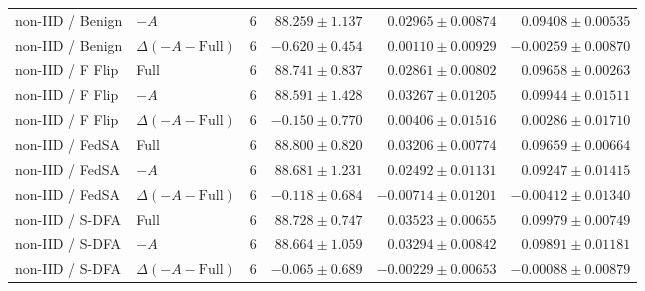 \begin{table}[t]
\begin{tabular}{llrrrr}
non-IID / Benign & $-A$ & 6 & $88.259 \pm 1.137$ & $0.02965 \pm 0.00874$ & $0.09408 \pm 0.00535$ \\
non-IID / Benign & $\Delta(-A-\mathrm{Full})$ & 6 & $-0.620 \pm 0.454$ & $0.00110 \pm 0.00929$ & $-0.00259 \pm 0.00870$ \\
non-IID / F Flip & Full & 6 & $88.741 \pm 0.837$ & $0.02861 \pm 0.00802$ & $0.09658 \pm 0.00263$ \\
non-IID / F Flip & $-A$ & 6 & $88.591 \pm 1.428$ & $0.03267 \pm 0.01205$ & $0.09944 \pm 0.01511$ \\
non-IID / F Flip & $\Delta(-A-\mathrm{Full})$ & 6 & $-0.150 \pm 0.770$ & $0.00406 \pm 0.01516$ & $0.00286 \pm 0.01710$ \\
non-IID / FedSA & Full & 6 & $88.800 \pm 0.820$ & $0.03206 \pm 0.00774$ & $0.09659 \pm 0.00664$ \\
non-IID / FedSA & $-A$ & 6 & $88.681 \pm 1.231$ & $0.02492 \pm 0.01131$ & $0.09247 \pm 0.01415$ \\
non-IID / FedSA & $\Delta(-A-\mathrm{Full})$ & 6 & $-0.118 \pm 0.684$ & $-0.00714 \pm 0.01201$ & $-0.00412 \pm 0.01340$ \\
non-IID / S-DFA & Full & 6 & $88.728 \pm 0.747$ & $0.03523 \pm 0.00655$ & $0.09979 \pm 0.00749$ \\
non-IID / S-DFA & $-A$ & 6 & $88.664 \pm 1.059$ & $0.03294 \pm 0.00842$ & $0.09891 \pm 0.01181$ \\
non-IID / S-DFA & $\Delta(-A-\mathrm{Full})$ & 6 & $-0.065 \pm 0.689$ & $-0.00229 \pm 0.00653$ & $-0.00088 \pm 0.00879$ \\
\bottomrule
\end{tabular}
\end{table}

